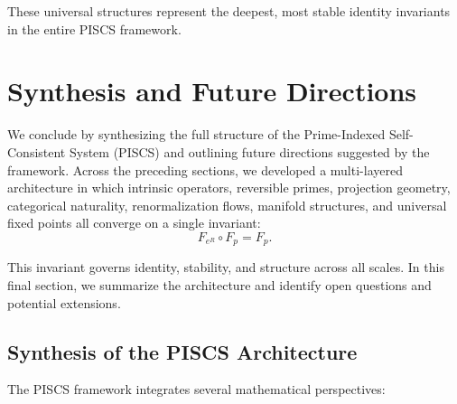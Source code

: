 \documentclass[11pt]{article}
\theoremstyle{definition}
\theoremstyle{plain}
\theoremstyle{remark}
\begin{document}
These universal structures represent the deepest, most stable identity
invariants in the entire PISCS framework.

\section{Synthesis and Future Directions}

We conclude by synthesizing the full structure of the Prime-Indexed
Self-Consistent System (PISCS) and outlining future directions suggested
by the framework. Across the preceding sections, we developed a
multi-layered architecture in which intrinsic operators, reversible
primes, projection geometry, categorical naturality, renormalization
flows, manifold structures, and universal fixed points all converge on a
single invariant:
\[
F_{e^R} \circ F_p = F_p.
\]

This invariant governs identity, stability, and structure across all
scales. In this final section, we summarize the architecture and identify
open questions and potential extensions.

\subsection{Synthesis of the PISCS Architecture}

The PISCS framework integrates several mathematical perspectives:
\end{document}

